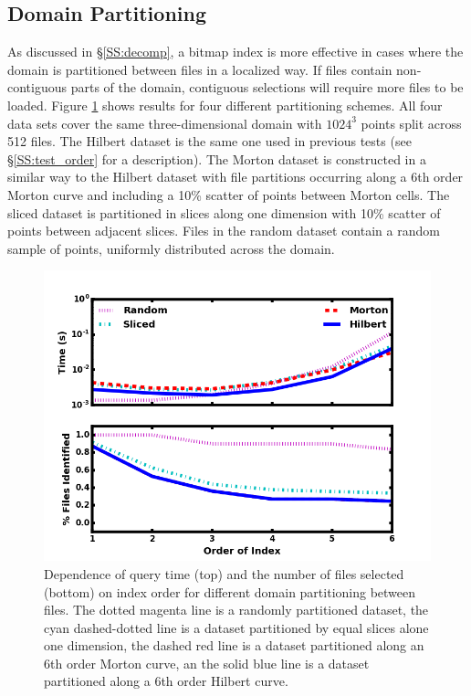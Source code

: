 \documentclass[apjl]{emulateapj}
\begin{document}
\subsection{Domain Partitioning}\label{SS:test_decomp}
%
As discussed in \S\ref{SS:decomp}, a bitmap index is more effective in cases where the domain is partitioned between files in a localized way. If files contain non-contiguous parts of the domain, contiguous selections will require more files to be loaded. Figure \ref{fig:test_decomp} shows results for four different partitioning schemes. All four data sets cover the same three-dimensional domain with $1024^3$ points split across 512 files. The Hilbert dataset is the same one used in previous tests (see \S\ref{SS:test_order} for a description). The Morton dataset is constructed in a similar way to the Hilbert dataset with file partitions occurring along a 6th order Morton curve and including a 10\% scatter of points between Morton cells. The sliced dataset is partitioned in slices along one dimension with 10\% scatter of points between adjacent slices. Files in the random dataset contain a random sample of points, uniformly distributed across the domain.
%
\begin{figure}[hbpt]
\begin{center}
\includegraphics[width=\columnwidth,keepaspectratio]{../images/vary_decomp_np1024_nf512_or0.png}
\caption{Dependence of query time (top) and the number of files selected (bottom) on index order for different domain partitioning between files. The dotted magenta line is a randomly partitioned dataset, the cyan dashed-dotted line is a dataset partitioned by equal slices alone one dimension, the dashed red line is a dataset partitioned along an 6th order Morton curve, an the solid blue line is a dataset partitioned along a 6th order Hilbert curve.}
\label{fig:test_decomp}
\end{center}
\end{figure}
\end{document}
